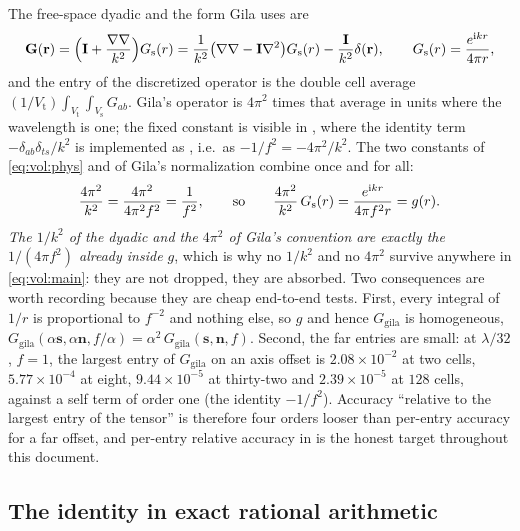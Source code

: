 The free-space dyadic and the form Gila uses are
\begin{equation}
\mathbf{G}(\mathbf{r}) = \Bigl(\mathbf{I} + \frac{\nabla\nabla}{k^2}\Bigr)G_{\mathrm{s}}(r)
= \frac{1}{k^2}\bigl(\nabla\nabla - \mathbf{I}\nabla^2\bigr)G_{\mathrm{s}}(r)
- \frac{\mathbf{I}}{k^2}\delta(\mathbf{r}),
\qquad G_{\mathrm{s}}(r) = \frac{e^{\mathrm{i} k r}}{4\pi r},
\label{eq:vol:phys}
\end{equation}
and the entry of the discretized operator is the double cell average
$(1/V_{\mathrm{t}})\int_{V_{\mathrm{t}}}\int_{V_{\mathrm{s}}} G_{ab}$. Gila's operator is
$4\pi^2$ times that average in units where the wavelength is one; the fixed constant is
visible in , where the identity term $-\delta_{ab}\delta_{ts}/k^2$ is
implemented as , i.e.\ as $-1/f^2 =
-4\pi^2/k^2$. The two constants of \eqref{eq:vol:phys} and of Gila's normalization
combine once and for all:
\begin{equation}
\frac{4\pi^2}{k^2} = \frac{4\pi^2}{4\pi^2 f^2} = \frac{1}{f^2},
\qquad\text{so}\qquad
\frac{4\pi^2}{k^2}\,G_{\mathrm{s}}(r) = \frac{e^{\mathrm{i} k r}}{4\pi f^2 r} = g(r).
\label{eq:vol:const}
\end{equation}
\emph{The $1/k^2$ of the dyadic and the $4\pi^2$ of Gila's convention are exactly the
$1/(4\pi f^2)$ already inside $g$}, which is why no $1/k^2$ and no $4\pi^2$ survive
anywhere in \eqref{eq:vol:main}: they are not dropped, they are absorbed. Two
consequences are worth recording because they are cheap end-to-end tests. First, every
integral of $1/r$ is proportional to $f^{-2}$ and nothing else, so $g$ and hence
$G_{\mathrm{gila}}$ is homogeneous, $G_{\mathrm{gila}}(\alpha\mathbf{s},
\alpha\mathbf{n}, f/\alpha) = \alpha^{2}\,G_{\mathrm{gila}}(\mathbf{s},\mathbf{n},f)$.
Second, the far entries are small: at $\lambda/32$, $f=1$, the largest entry of
$G_{\mathrm{gila}}$ on an axis offset is $2.08\times10^{-2}$ at two cells,
$5.77\times10^{-4}$ at eight, $9.44\times10^{-5}$ at thirty-two and
$2.39\times10^{-5}$ at $128$ cells, against a self term of order one (the identity
$-1/f^2$). Accuracy ``relative to the largest entry of the tensor'' is therefore four
orders looser than per-entry accuracy for a far offset, and per-entry relative accuracy in
 is the honest target throughout this document.

\subsection{The identity in exact rational arithmetic}
\label{sec:vol:exact}

